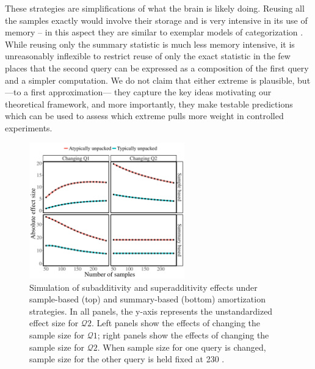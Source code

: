 These strategies are simplifications of what the brain is likely doing. 
Reusing all the samples exactly would involve their storage and is very intensive in its use of memory -- in this aspect they are similar to exemplar models of categorization \citep{nosofsky1986attention,medin1978context}. 
While reusing only the summary statistic is much less memory intensive, it is unreasonably inflexible to restrict reuse of only the exact statistic in the few places that the second query can be expressed as a composition of the first query and a simpler computation. We do not claim that either extreme is plausible, but ---to a first approximation--- they capture the key ideas motivating our theoretical framework, and more importantly, they make testable predictions which can be used to assess which extreme pulls more weight in controlled experiments.

\begin{figure}%
\centering
\includegraphics[width=0.6\textwidth]{figures/changingN.pdf}
\caption{Simulation of subadditivity and superadditivity effects under sample-based (top) and summary-based (bottom) amortization strategies. In all panels, the y-axis represents the unstandardized effect size for $\mathcal{Q}2$. Left panels show the effects of changing the sample size for $\mathcal{Q}1$; right panels show the effects of changing the sample size for $\mathcal{Q}2$. When sample size for one query is changed, sample size for the other query is held fixed at 230 \citep[the sample size estimated by][]{dasgupta17}.}
\label{fig:changeN}
\end{figure}

